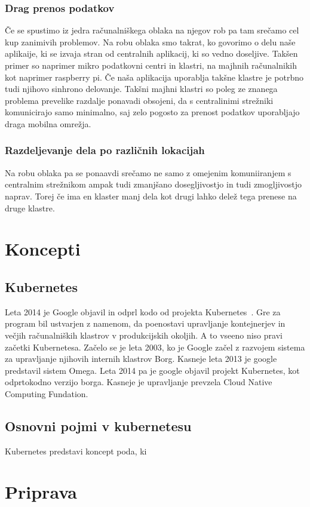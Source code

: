 \documentclass[a4paper, 12pt]{book}
\begin{document}
\subsection{Drag prenos podatkov}
Če se spustimo iz jedra računalniškega oblaka na njegov rob pa tam srečamo cel kup zanimivih problemov. 
Na robu oblaka smo takrat, ko govorimo o delu naše aplikaije, ki se izvaja stran od centralnih aplikacij, ki so vedno doseljive.
Takšen primer so naprimer mikro podatkovni centri in klastri, na majhnih računalnikih kot naprimer raspberry pi.
Če naša aplikacija uporablja takšne klastre je potrbno tudi njihovo sinhrono delovanje.
Takšni majhni klastri so poleg ze znanega problema prevelike razdalje ponavadi obsojeni, da s centralinimi strežniki komunicirajo samo minimalno, saj zelo pogosto za prenost podatkov uporabljajo draga mobilna omrežja.
\subsection{Razdeljevanje dela po različnih lokacijah}
Na robu oblaka pa se ponaavdi srečamo ne samo z omejenim komuniiranjem s centralnim strežnikom ampak tudi zmanjšano dosegljivostjo in tudi zmogljivostjo naprav.
Torej če ima en klaster manj dela kot drugi lahko delež tega prenese na druge klastre.
\chapter{Koncepti}
\label{ch0}
\section{Kubernetes}
Leta 2014 je Google objavil in odprl kodo od projekta Kubernetes~\cite{whatiskubernetes}.
Gre za program bil ustvarjen z namenom, da poenostavi upravljanje kontejnerjev in večjih računalniških klastrov v produkcijskih okoljih.
A to vseeno niso pravi začetki Kubernetesa.
Začelo se je leta 2003, ko je Google začel z razvojem sistema za upravljanje njihovih internih klastrov Borg.
Kasneje leta 2013 je google predstavil sistem Omega.
Leta 2014 pa je google objavil projekt Kubernetes, kot odprtokodno verzijo borga. Kasneje je upravljanje prevzela Cloud Native Computing Fundation.
\section{Osnovni pojmi v kubernetesu}
Kubernetes predstavi koncept poda, ki 
\chapter{Priprava}
\end{document}
